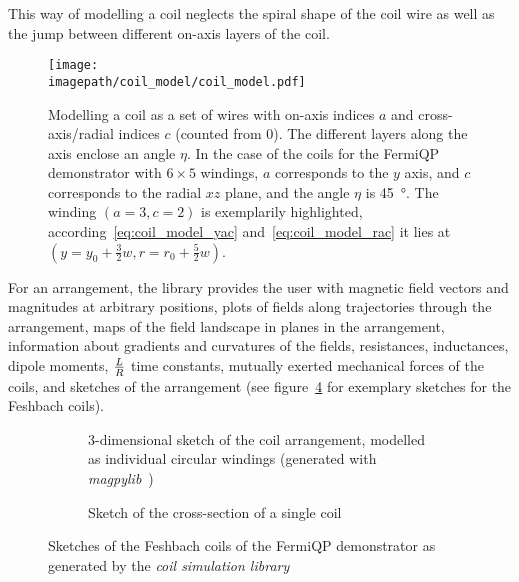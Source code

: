 This way of modelling a coil neglects the spiral shape of the coil wire as well as the jump between different on-axis layers of the coil.

\begin{figure}
    \centering
    \texttt{[image: \\imagepath/coil\_model/coil\_model.pdf]}
    \caption{Modelling a coil as a set of wires with on-axis indices $a$ and cross-axis/radial indices $c$ (counted from $0$). The different layers along the axis enclose an angle $\eta$. In the case of the coils for the FermiQP demonstrator with $6 \times 5$ windings, $a$ corresponds to the $y$ axis, and $c$ corresponds to the radial $xz$ plane, and the angle $\eta$ is \SI[]{45}{\degree}. The winding $(a = 3, c=2)$ is exemplarily highlighted, according~\eqref{eq:coil_model_yac} and~\eqref{eq:coil_model_rac} it lies at $(y = y_0 + \frac{3}{2}w, r = r_0 + \frac{5}{2}w)$.}
    \label{fig:coil_model}
\end{figure}

For an arrangement, the library provides the user with magnetic field vectors and magnitudes at arbitrary positions, plots of fields along trajectories through the arrangement, maps of the field landscape in planes in the arrangement, information about gradients and curvatures of the fields, resistances, inductances, dipole moments, $L\over R$ time constants, mutually exerted mechanical forces of the coils, and sketches of the arrangement (see figure~\ref{fig:csl_sketches} for exemplary sketches for the Feshbach coils).

\begin{figure}
    \centering
    \begin{subfigure}[t]{0.47\textwidth}
        \centering
        \resizebox{\textwidth}{!}{
            \begin{pgfpicture}
                \pgftext{}
            \end{pgfpicture}
        }
        \caption{3-dimensional sketch of the coil arrangement, modelled as individual circular windings (generated with \textit{magpylib}~\cite{noauthor_magpylibmagpylib_2022})}
        \label{fig:csl_sketches_3d}
    \end{subfigure}
    \hspace{0.04\textwidth}
    \begin{subfigure}[t]{0.47\textwidth}
        \centering
        \resizebox{\textwidth}{!}{
            \begin{pgfpicture}
                \pgftext{}
            \end{pgfpicture}
        }
        \caption{Sketch of the cross-section of a single coil}
        \label{fig:csl_sketches_cross_section}
    \end{subfigure}
    \caption{Sketches of the Feshbach coils of the FermiQP demonstrator as generated by the \textit{coil simulation library}}
    \label{fig:csl_sketches}
\end{figure}

